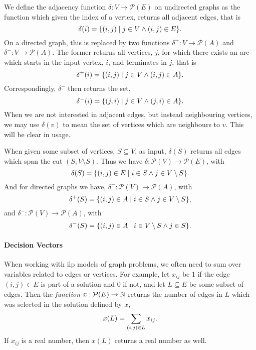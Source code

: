 We define the adjacency function $\delta : V \to \mathcal{P} (E)$ on undirected graphs as
the function which given the index of a vertex, returns all adjacent edges, that is
$$\delta(i) = \{(i,j) \mid j \in V \wedge (i, j) \in E\}\mathnormal{.}$$
On a directed graph, this is replaced by two functions
$\delta^+ : V \to \mathcal{P} (A)$
and $\delta^-: V \to \mathcal{P} (A)$.
The former returns all vertices, $j$, for which there exists an arc
which starts in the input vertex, $i$, and terminates in $j$, that is
$$\delta^+(i) = \{(i, j) \mid j \in V \wedge (i, j) \in A\}\mathnormal{.}$$
Correspondingly, $\delta^-$ then returns the set,
$$\delta^-(i) = \{(j, i) \mid j \in V \wedge (j, i) \in A\}\mathnormal{.}$$
When we are not interested in adjacent edges, but instead neighbouring vertices,
we may use $\delta(v)$ to mean the set of vertices which are neighbours to $v$.
This will be clear in usage.


When given some subset of vertices, $S \subseteq V$, as input,
$\delta(S)$ returns all edges which span the cut $(S, V \setminus S)$.
Thus we have $\delta : \mathcal{P}(V) \to \mathcal{P}(E)$, with
$$\delta(S) = \{(i,j) \in E \mid i \in S \wedge j \in V \setminus S\}\mathnormal{.}$$
And for directed graphs we have, $\delta^+ : \mathcal{P}(V) \to \mathcal{P}(A)$, with
$$\delta^+(S) = \{(i,j) \in A \mid i \in S \wedge j \in V \setminus S\}\mathnormal{,}$$
and $\delta^- : \mathcal{P}(V) \to \mathcal{P}(A)$, with
$$\delta^-(S) = \{(i,j) \in A \mid i \in V \setminus S \wedge j \in S\}\mathnormal{.}$$

\paragraph{Decision Vectors}

When working with \gls{ilp} models of graph problems, we often need to sum over variables
related to edges or vertices. For example, let $x_{ij}$ be $1$ if the edge $(i,j) \in E$
is part of a solution and $0$ if not, and let $L \subseteq E$ be some subset of edges.
Then the \textit{function} $x : \mathcal{P} (E) \to \mathbb{N}$ returns the number of edges
 in $L$ which was selected in the solution defined by $x$,
 $$x(L) = \sum_{(i, j) \in L} x_{ij}\mathnormal{.}$$
 If $x_{ij}$ is a real number, then $x(L)$ returns a real number as well.

 \clearpage
\glsaddall
\printglossaries

